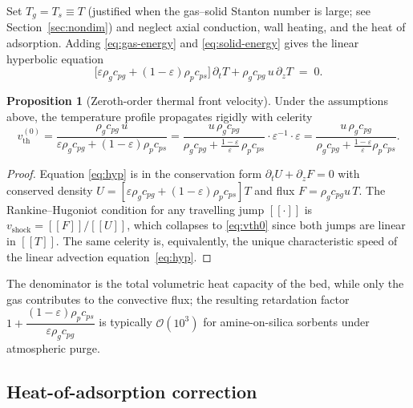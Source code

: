 \documentclass[a4paper,11pt]{amsart}
\theoremstyle{definition}
\newtheorem{proposition}{Proposition}
\begin{document}
Set $T_g=T_s\equiv T$ (justified when the gas--solid Stanton number is large; see Section~\ref{sec:nondim}) and neglect axial conduction, wall heating, and the heat of adsorption. Adding \eqref{eq:gas-energy} and \eqref{eq:solid-energy} gives the linear hyperbolic equation
\begin{equation}\label{eq:hyp}
\bigl[\varepsilon\rho_g c_{pg}+(1-\varepsilon)\rho_p c_{ps}\bigr]\,\partial_t T
+ \rho_g c_{pg}\,u\,\partial_z T \;=\; 0.
\end{equation}

\begin{proposition}[Zeroth-order thermal front velocity]
Under the assumptions above, the temperature profile propagates rigidly with celerity
\begin{equation}\label{eq:vth0}
v_{\mathrm{th}}^{(0)}=\frac{\rho_g c_{pg}\,u}{\varepsilon\rho_g c_{pg}+(1-\varepsilon)\rho_p c_{ps}}
=\frac{u\,\rho_g c_{pg}}{\rho_g c_{pg}+\frac{1-\varepsilon}{\varepsilon}\,\rho_p c_{ps}}\cdot\varepsilon^{-1}\cdot\varepsilon
=\frac{u\,\rho_g c_{pg}}{\rho_g c_{pg}+\frac{1-\varepsilon}{\varepsilon}\rho_p c_{ps}}.
\end{equation}
\end{proposition}

\begin{proof}
Equation \eqref{eq:hyp} is in the conservation form $\partial_t U+\partial_z F=0$ with conserved density $U=[\varepsilon\rho_g c_{pg}+(1-\varepsilon)\rho_p c_{ps}]T$ and flux $F=\rho_g c_{pg}u\,T$. The Rankine--Hugoniot condition for any travelling jump $[\![\cdot]\!]$ is $v_{\text{shock}}=[\![F]\!]/[\![U]\!]$, which collapses to \eqref{eq:vth0} since both jumps are linear in $[\![T]\!]$. The same celerity is, equivalently, the unique characteristic speed of the linear advection equation~\eqref{eq:hyp}.
\end{proof}

The denominator is the total volumetric heat capacity of the bed, while only the gas contributes to the convective flux; the resulting retardation factor
\(
1+\dfrac{(1-\varepsilon)\rho_p c_{ps}}{\varepsilon\rho_g c_{pg}}
\)
is typically $\mathcal{O}(10^3)$ for amine-on-silica sorbents under atmospheric purge.

\subsection{Heat-of-adsorption correction}
\end{document}
